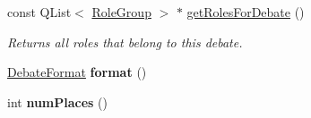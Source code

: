 \begin{DoxyCompactItemize}
\item 
\hypertarget{classBPSDebate_a44c883b01ab5357a4fd07db2b7ff4dbc}{const Q\-List$<$ \hyperlink{classDebate_ae9871a36a2f3de7a7da8922d70fbece4}{Role\-Group} $>$ $\ast$ \hyperlink{classBPSDebate_a44c883b01ab5357a4fd07db2b7ff4dbc}{get\-Roles\-For\-Debate} ()}\label{classBPSDebate_a44c883b01ab5357a4fd07db2b7ff4dbc}

\begin{DoxyCompactList}\small\item\em Returns all roles that belong to this debate. \end{DoxyCompactList}\item 
\hypertarget{classBPSDebate_ab8f49170df500405e81e70ab83c4f70d}{\hyperlink{classDebate_a537fac343de1edd412012e4180b52e04}{Debate\-Format} {\bfseries format} ()}\label{classBPSDebate_ab8f49170df500405e81e70ab83c4f70d}

\item 
\hypertarget{classBPSDebate_a2674e7ed45e67a443fd36ca4b2d3a2a4}{int {\bfseries num\-Places} ()}\label{classBPSDebate_a2674e7ed45e67a443fd36ca4b2d3a2a4}

\end{DoxyCompactItemize}
